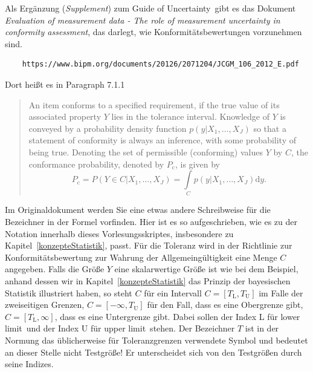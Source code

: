 Als Ergänzung (\textsl{Supplement}) zum \glqq Guide of Uncertainty\grqq ~gibt es das Dokument
\textsl{Evaluation of measurement data - The role of measurement uncertainty in conformity assessment},
das darlegt, wie Konformitätsbewertungen vorzunehmen sind.
\begin{verbatim}
	https://www.bipm.org/documents/20126/2071204/JCGM_106_2012_E.pdf
\end{verbatim}
Dort heißt es in Paragraph 7.1.1
\begin{quote}
	An item conforms to a specified requirement,
	if the true value of its associated property $Y$ lies in the tolerance
	interval. Knowledge of $Y$ is conveyed by a probability density function $p(y|{X_1,\dots,X_J})$
	so that a statement of conformity is always an inference,
	with some probability of being true. Denoting the set of permissible (conforming) values
	$Y$ by $C$, the conformance probability, denoted by $P_\mathrm{c}$, is given by
	\begin{equation}
		P_\mathrm{c} = P(Y \in C | {X_1,\dots,X_J}) = \int\limits_C p(y|{X_1,\dots,X_J}) \mathrm{d}y.
	\end{equation}
\end{quote}
Im Originaldokument werden Sie eine etwas andere Schreibweise für die Bezeichner in der Formel vorfinden.
Hier ist es so aufgeschrieben, wie es zu der Notation innerhalb dieses Vorlesungsskriptes, insbesondere
zu Kapitel~\ref{konzepteStatistik}, passt.
Für die Toleranz wird in der Richtlinie zur Konformitätsbewertung zur Wahrung der Allgemeingültigkeit
eine Menge $C$ angegeben. Falls die Größe $Y$ eine skalarwertige Größe ist wie bei dem Beispiel, anhand dessen
wir in Kapitel~\ref{konzepteStatistik} das Prinzip der bayesischen Statistik illustriert haben,
so steht $C$ für ein Intervall $C = [T_\mathrm{L}, T_\mathrm{U}]$ im Falle der zweiseitigen
Grenzen, $C = [-\infty, T_\mathrm{U}]$ für den Fall, dass es eine Obergrenze gibt,
$C = [T_\mathrm{L}, \infty]$, dass es eine Untergrenze gibt. Dabei sollen der Index L für \glqq lower
limit\grqq ~und der Index U für \glqq upper limit\grqq ~stehen. Der Bezeichner $T$ ist in der
Normung das üblicherweise für Toleranzgrenzen verwendete Symbol und bedeutet an dieser
Stelle nicht Testgröße! Er unterscheidet sich von den Testgrößen durch seine Indizes.

